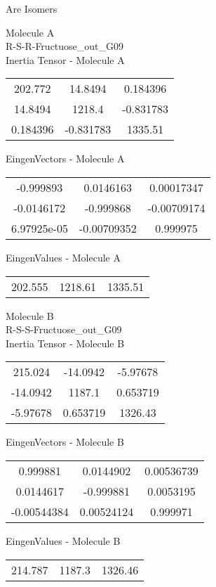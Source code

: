 \begin{center}
\vtab
\vtab
\textcolor{NavyBlue}{\Large Are Isomers}
\end{center}
\newpage
\begin{multicols}{2}
\begin{center}
Molecule A \\ 
R-S-R-Fructuose\_out\_G09
\\
Inertia Tensor - Molecule A \\
\vtab
\begin{tabular}{|c c c|}
202.772	 & 	14.8494	 & 	0.184396	 \\
14.8494	 & 	1218.4	 & 	-0.831783	 \\
0.184396	 & 	-0.831783	 & 	1335.51
\end{tabular}

\vtab
 EingenVectors - Molecule A     \\
\vtab
\begin{tabular}{|c c c|}
-0.999893	 & 	0.0146163	 & 	0.00017347	 \\
-0.0146172	 & 	-0.999868	 & 	-0.00709174	 \\
6.97925e-05	 & 	-0.00709352	 & 	0.999975
\end{tabular}

\vtab
 EingenValues - Molecule A     \\
\vtab
\begin{tabular}{|c c c|}
202.555	 & 	1218.61	 & 	1335.51
\end{tabular}
\columnbreak

Molecule B \\ 
R-S-S-Fructuose\_out\_G09
\\
Inertia Tensor - Molecule B \\
\vtab
\begin{tabular}{|c c c|}
215.024	 & 	-14.0942	 & 	-5.97678	 \\
-14.0942	 & 	1187.1	 & 	0.653719	 \\
-5.97678	 & 	0.653719	 & 	1326.43
\end{tabular}

\vtab
 EingenVectors - Molecule B     \\
\vtab
\begin{tabular}{|c c c|}
0.999881	 & 	0.0144902	 & 	0.00536739	 \\
0.0144617	 & 	-0.999881	 & 	0.0053195	 \\
-0.00544384	 & 	0.00524124	 & 	0.999971
\end{tabular}

\vtab
 EingenValues - Molecule B     \\
\vtab
\begin{tabular}{|c c c|}
214.787	 & 	1187.3	 & 	1326.46
\end{tabular}

\end{center}
\end{multicols}
